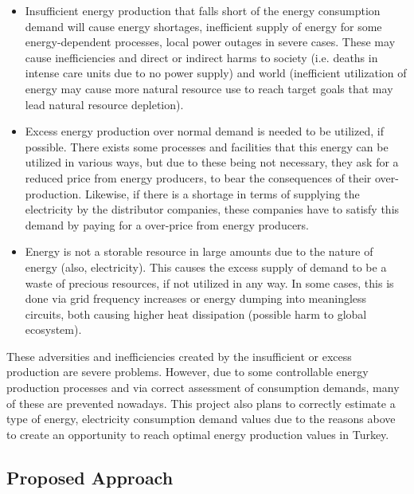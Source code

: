 \documentclass[11pt, a4paper, leqno]{article}
\begin{document}
\begin{itemize}
    \item Insufficient energy production that falls short of the energy consumption demand will cause energy shortages, inefficient supply of energy for some energy-dependent processes, local power outages in severe cases. These may cause inefficiencies and direct or indirect harms to society (i.e. deaths in intense care units due to no power supply) and world (inefficient utilization of energy may cause more natural resource use to reach target goals that may lead natural resource depletion).
    \item Excess energy production over normal demand is needed to be utilized, if possible. There exists some processes and facilities that this energy can be utilized in various ways, but due to these being not necessary, they ask for a reduced price from energy producers, to bear the consequences of their over-production. Likewise, if there is a shortage in terms of supplying the electricity by the distributor companies, these companies have to satisfy this demand by paying for a over-price from energy producers.
    \item Energy is not a storable resource in large amounts due to the nature of energy (also, electricity). This causes the excess supply of demand to be a waste of precious resources, if not utilized in any way. In some cases, this is done via grid frequency increases or energy dumping into meaningless circuits, both causing higher heat dissipation (possible harm to global ecosystem).
\end{itemize}

These adversities and inefficiencies created by the insufficient or excess production are severe problems. However, due to some controllable energy production processes and via correct assessment of consumption demands, many of these are prevented nowadays. This project also plans to correctly estimate a type of energy, electricity consumption demand values due to the reasons above to create an opportunity to reach optimal energy production values in Turkey.







\subsection{Proposed Approach}
\label{subsec:propapp}
\end{document}
